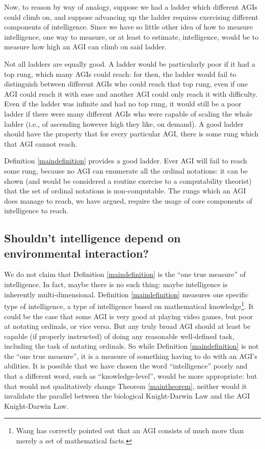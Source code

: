\documentclass[runningheads]{llncs}
\begin{document}
Now, to reason by way of analogy, suppose we had a ladder which different AGIs
could climb on, and suppose advancing up the ladder requires exercising different
components of intelligence. Since we have so little other idea of how to measure
intelligence, one way to measure, or at least to estimate, intelligence, would be
to measure how high an AGI can climb on said ladder.

Not all ladders are equally good. A ladder would be particularly poor if it had
a top rung, which many AGIs could reach: for then, the ladder would fail to
distinguish between different AGIs who could reach that top rung, even if one
AGI could reach it with ease and another AGI could only reach it with difficulty.
Even if the ladder was infinite and had no top rung, it would still be a poor
ladder if there were many different AGIs who were capable of scaling the whole
ladder (i.e., of ascending however high they like, on demand). A good ladder
should have the property that for every particular AGI, there is some rung which
that AGI cannot reach.

Definition \ref{maindefinition} provides a good ladder. Ever AGI will fail to
reach some rung, because no AGI can enumerate all the ordinal notations: it can
be shown (and would be considered a routine exercise to a computability theorist)
that the set of ordinal notations is non-computable. The rungs which an AGI does
manage to reach, we have argued, require the usage of core components of intelligence
to reach.

\subsection{Shouldn't intelligence depend on environmental interaction?}

We do not claim that Definition \ref{maindefinition} is the ``one true measure'' of
intelligence. In fact, maybe there is no such thing: maybe intelligence is inherently
multi-dimensional. Definition \ref{maindefinition} measures one specific type of
intelligence, a type of intelligence based on mathematical knowledge\footnote{Wang has
correctly pointed out \cite{wang2007} that an AGI consists of much more than merely
a set of mathematical facts.}. It could be the
case that some AGI is very good at playing video games, but poor at notating ordinals,
or vice versa. But any truly broad AGI should at least be capable (if properly
instructed) of doing any reasonable well-defined task, including the task of
notating ordinals.
So while Definition \ref{maindefinition} is not the ``one true measure'', it is a
measure of something having to do with an AGI's abilities. It is possible that we
have chosen the word ``intelligence'' poorly and that a different word, such as
``knowledge-level'', would be more appropriate: but that would not qualitatively change
Theorem \ref{maintheorem}, neither would it
invalidate the parallel between the biological Knight-Darwin Law and the
AGI Knight-Darwin Law.
\end{document}
